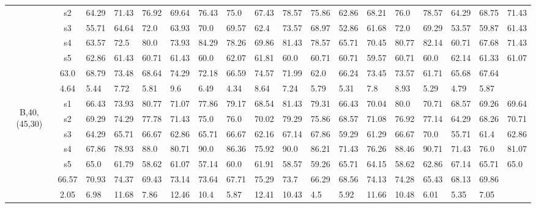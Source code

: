 \begin{table}[h]
{\begin{tabular}{cc|llll|llll|llll|llll}
 & s2 & 64.29 & 71.43 & 76.92 & 69.64 & 76.43 & 75.0 & 67.43 & 78.57 & 75.86 & 62.86 & 68.21 & 76.0 & 78.57 & 64.29 & 68.75 & 71.43 \\
 & s3 & 55.71 & 64.64 & 72.0 & 63.93 & 70.0 & 69.57 & 62.4 & 73.57 & 68.97 & 52.86 & 61.68 & 72.0 & 69.29 & 53.57 & 59.87 & 61.43 \\
 & s4 & 63.57 & 72.5 & 80.0 & 73.93 & 84.29 & 78.26 & 69.86 & 81.43 & 78.57 & 65.71 & 70.45 & 80.77 & 82.14 & 60.71 & 67.68 & 71.43 \\
 & s5 & 62.86 & 61.43 & 60.71 & 61.43 & 60.0 & 62.07 & 61.81 & 60.0 & 60.71 & 60.71 & 59.57 & 60.71 & 60.0 & 62.14 & 61.33 & 61.07 \\
\rowcolor{lightgray!50}\multicolumn{2}{r|}{avg} & 63.0 & 68.79 & 73.48 & 68.64 & 74.29 & 72.18 & 66.59 & 74.57 & 71.99 & 62.0 & 66.24 & 73.45 & 73.57 & 61.71 & 65.68 & 67.64 \\
\rowcolor{lightgray!50}\multicolumn{2}{r|}{std} & 4.64 & 5.44 & 7.72 & 5.81 & 9.6 & 6.49 & 4.34 & 8.64 & 7.24 & 5.79 & 5.31 & 7.8 & 8.93 & 5.29 & 4.79 & 5.87 \\
\multirow{6}{*}{\begin{sideways}B,40,(45,30)\end{sideways}} & s1 & 66.43 & 73.93 & 80.77 & 71.07 & 77.86 & 79.17 & 68.54 & 81.43 & 79.31 & 66.43 & 70.04 & 80.0 & 70.71 & 68.57 & 69.26 & 69.64 \\
 & s2 & 69.29 & 74.29 & 77.78 & 71.43 & 75.0 & 76.0 & 70.02 & 79.29 & 75.86 & 68.57 & 71.08 & 76.92 & 77.14 & 64.29 & 68.26 & 70.71 \\
 & s3 & 64.29 & 65.71 & 66.67 & 62.86 & 65.71 & 66.67 & 62.16 & 67.14 & 67.86 & 59.29 & 61.29 & 66.67 & 70.0 & 55.71 & 61.4 & 62.86 \\
 & s4 & 67.86 & 78.93 & 88.0 & 80.71 & 90.0 & 86.36 & 75.92 & 90.0 & 86.21 & 71.43 & 76.26 & 88.46 & 90.71 & 71.43 & 76.0 & 81.07 \\
 & s5 & 65.0 & 61.79 & 58.62 & 61.07 & 57.14 & 60.0 & 61.91 & 58.57 & 59.26 & 65.71 & 64.15 & 58.62 & 62.86 & 67.14 & 65.71 & 65.0 \\
\rowcolor{lightgray!50}\multicolumn{2}{r|}{avg} & 66.57 & 70.93 & 74.37 & 69.43 & 73.14 & 73.64 & 67.71 & 75.29 & 73.7 & 66.29 & 68.56 & 74.13 & 74.28 & 65.43 & 68.13 & 69.86 \\
\rowcolor{lightgray!50}\multicolumn{2}{r|}{std} & 2.05 & 6.98 & 11.68 & 7.86 & 12.46 & 10.4 & 5.87 & 12.41 & 10.43 & 4.5 & 5.92 & 11.66 & 10.48 & 6.01 & 5.35 & 7.05
\end{tabular}}
\end{table}

